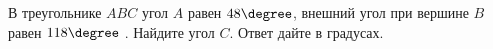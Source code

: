 \begin{ex}
	\begin{condition}
		В треугольнике \( ABC  \) угол \( A \) равен \( 48 \degree\), внешний угол при вершине \( B \) равен \( 118 \degree\) . Найдите угол \( C \). Ответ дайте в градусах.
	\end{condition}
\end{ex}